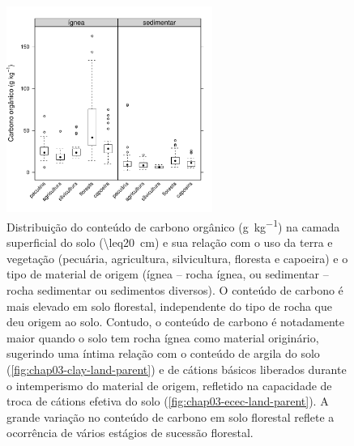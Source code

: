 \begin{figure}[!ht]
\centering
\includegraphics[width=0.60\textwidth]{fig/chap03-orca-land-parent}
\caption[Carbono orgânico no solo e sua relação com o uso da terra e o material de origem do solo.]{
Distribuição do conteúdo de carbono orgânico (\si{\gram\per\kilo\gram}) na camada superficial do solo 
(\SI{\leq20}{\cm}) e sua relação com o uso da terra e vegetação (pecuária, agricultura, silvicultura, floresta 
e capoeira) e o tipo de material de origem (ígnea -- rocha ígnea, ou sedimentar -- rocha sedimentar ou 
sedimentos diversos). O conteúdo de carbono é mais elevado em solo florestal, independente do tipo de rocha 
que deu origem ao solo. Contudo, o conteúdo de carbono é notadamente maior quando o solo tem rocha ígnea como 
material originário, sugerindo uma íntima relação com o conteúdo de argila do solo 
(\autoref{fig:chap03-clay-land-parent}) e de cátions básicos liberados durante o intemperismo do material de 
origem, refletido na capacidade de troca de cátions efetiva do solo (\autoref{fig:chap03-ecec-land-parent}). A 
grande variação no conteúdo de carbono em solo florestal reflete a ocorrência de vários estágios de sucessão 
florestal.}
\label{fig:chap03-orca-land-parent}
\end{figure}

